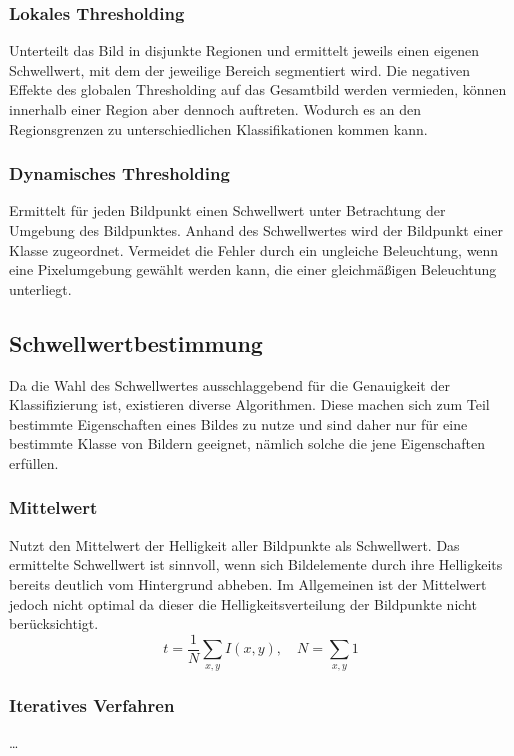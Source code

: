 \subsubsection*{Lokales Thresholding}
Unterteilt das Bild in disjunkte Regionen und ermittelt jeweils einen eigenen Schwellwert, mit dem der jeweilige Bereich segmentiert wird.
Die negativen Effekte des globalen Thresholding auf das Gesamtbild werden vermieden, können innerhalb einer Region aber dennoch auftreten.
Wodurch es an den Regionsgrenzen zu unterschiedlichen Klassifikationen kommen kann.

\subsubsection*{Dynamisches Thresholding}
Ermittelt für jeden Bildpunkt einen Schwellwert unter Betrachtung der Umgebung des Bildpunktes.
Anhand des Schwellwertes wird der Bildpunkt einer Klasse zugeordnet.
Vermeidet die Fehler durch ein ungleiche Beleuchtung, wenn eine Pixelumgebung gewählt werden kann, die einer gleichmäßigen Beleuchtung unterliegt.

\subsection*{Schwellwertbestimmung}
Da die Wahl des Schwellwertes ausschlaggebend für die Genauigkeit der Klassifizierung ist, existieren diverse Algorithmen.
Diese machen sich zum Teil bestimmte Eigenschaften eines Bildes zu nutze und sind daher nur für eine bestimmte Klasse von Bildern geeignet, nämlich solche die jene Eigenschaften erfüllen.

\subsubsection*{Mittelwert}
Nutzt den Mittelwert der Helligkeit aller Bildpunkte als Schwellwert.
Das ermittelte Schwellwert ist sinnvoll, wenn sich Bildelemente durch ihre Helligkeits bereits deutlich vom Hintergrund abheben.
Im Allgemeinen ist der Mittelwert jedoch nicht optimal da dieser die Helligkeitsverteilung der Bildpunkte nicht berücksichtigt.
  \[ t = \frac{1}{N} \sum_{x,y} I(x,y), \quad N = \sum_{x,y} 1 \]

\subsubsection*{Iteratives Verfahren}
\ldots

